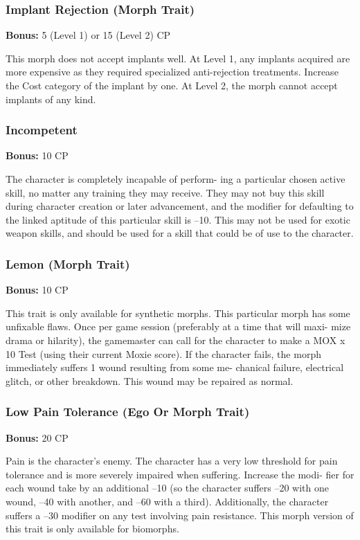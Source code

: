 \subsubsection{Implant Rejection (Morph Trait)}

\textbf{Bonus:} 5 (Level 1) or 15 (Level 2) CP

This morph does not accept implants well. At Level 
1, any implants acquired are more expensive as they 
required specialized anti-rejection treatments. Increase 
the Cost category of the implant by one. At Level 2, 
the morph cannot accept implants of any kind.

\subsubsection{Incompetent}

\textbf{Bonus:} 10 CP

The character is completely incapable of perform-
ing a particular chosen active skill, no matter any 
training they may receive. They may not buy this skill 
during character creation or later advancement, and 
the modifier for defaulting to the linked aptitude of 
this particular skill is –10. This may not be used for 
exotic weapon skills, and should be used for a skill 
that could be of use to the character.

\subsubsection{Lemon (Morph Trait)}

\textbf{Bonus:} 10 CP

This trait is only available for synthetic morphs. 
This particular morph has some unfixable flaws. Once 
per game session (preferably at a time that will maxi-
mize drama or hilarity), the gamemaster can call for 
the character to make a MOX x 10 Test (using their 
current Moxie score). If the character fails, the morph 
immediately suffers 1 wound resulting from some me-
chanical failure, electrical glitch, or other breakdown. 
This wound may be repaired as normal.

\subsubsection{Low Pain Tolerance (Ego Or Morph Trait)}

\textbf{Bonus:} 20 CP

Pain is the character's enemy. The character has 
a very low threshold for pain tolerance and is more 
severely impaired when suffering. Increase the modi-
fier for each wound take by an additional –10 (so 
the character suffers –20 with one wound, –40 with 
another, and –60 with a third). Additionally, the 
character suffers a –30 modifier on any test involving 
pain resistance. This morph version of this trait is only 
available for biomorphs.

